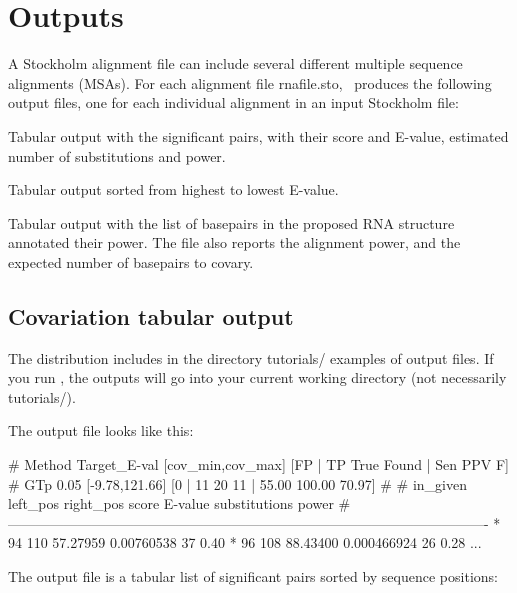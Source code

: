 \label{section:outputs}
\setcounter{footnote}{0}
\section{Outputs}

A Stockholm alignment file can include several different multiple
sequence alignments (MSAs).  For each alignment file
rnafile.sto, \rscape\ produces the following output files, one for
each individual alignment in an input Stockholm file:

\begin{sreitems}{}
%
\item[\emprog{rnafile\_msaname.cov}] Tabular output with the significant pairs,
  with their score and E-value, estimated number of substitutions and power.
%
\item[\emprog{rnafile\_msaname.sorted.cov}] Tabular output sorted from highest to
  lowest E-value.
%
\item[\emprog{rnafile\_msaname.power}]
Tabular output with the list of basepairs in the proposed RNA structure annotated their power. The file also reports 
the alignment power, and the expected number of basepairs to covary.
%
\end{sreitems}

\subsection{Covariation tabular output}

The distribution includes in the directory tutorials/ examples of
output files. If you run \rscape, the outputs will go into your
current working directory (not necessarily tutorials/).


The output file  looks like this:\\

\begin{sreoutput}
# Method Target_E-val [cov_min,cov_max] [FP | TP True Found | Sen PPV F] 
# GTp    0.05           [-9.78,121.66]    [0 | 11 20 11 | 55.00 100.00 70.97] 
#
# in_given  left_pos       right_pos        score          E-value       substitutions      power
#-------------------------------------------------------------------------------------------------------
*               94             110      57.27959        0.00760538      37              0.40
*               96             108      88.43400        0.000466924     26              0.28
...
\end{sreoutput}
The output file is a tabular list of significant pairs sorted by sequence positions:

